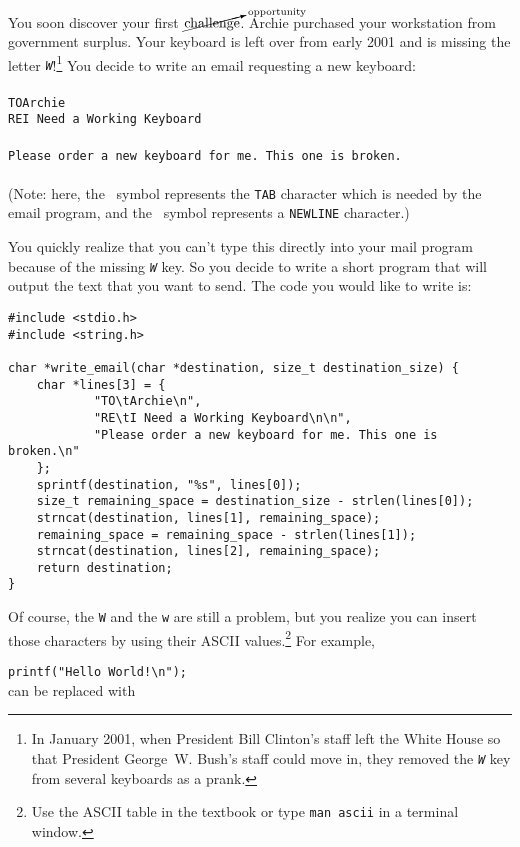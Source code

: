 You soon discover your first $\cancelto{\mathrm{opportunity}}{\mathrm{challenge}}$.
Archie purchased your workstation from government surplus.
Your keyboard is left over from early 2001 and is missing the letter \textit{\texttt{W}}!\footnote{In January 2001, when President Bill Clinton's staff left the White House so that President George~W. Bush's staff could move in, they removed the \textit{\texttt{W}} key from several keyboards as a prank.}
You decide to write an email requesting a new keyboard: \\
\\
\texttt{TO\tab Archie\nl} \\
\texttt{RE\tab I Need a Working Keyboard\nl} \\
\nl \\
\texttt{Please order a new keyboard for me. This one is broken.\nl } \\ \\
(Note: here, the \tab\ symbol represents the \texttt{TAB} character which is needed by the email program, and the \nl\ symbol represents a \texttt{NEWLINE} character.)

You quickly realize that you can't type this directly into your mail program because of the missing \textit{\texttt{W}} key.
So you decide to write a short program that will output the text that you want to send.
The code you would like to write is:

\begin{lstlisting}
#include <stdio.h>
#include <string.h>

char *write_email(char *destination, size_t destination_size) {
    char *lines[3] = {
            "TO\tArchie\n",
            "RE\tI Need a Working Keyboard\n\n",
            "Please order a new keyboard for me. This one is broken.\n"
    };
    sprintf(destination, "%s", lines[0]);
    size_t remaining_space = destination_size - strlen(lines[0]);
    strncat(destination, lines[1], remaining_space);
    remaining_space = remaining_space - strlen(lines[1]);
    strncat(destination, lines[2], remaining_space);
    return destination;
}
\end{lstlisting}

Of course, the \texttt{W} and the \texttt{w} are still a problem, but you realize you can insert those characters by using their ASCII values.\footnote{Use the ASCII table in the textbook or type \texttt{man ascii} in a terminal window.}
For example,

\lstinline{printf("Hello World!\n");} \\
can be replaced with

